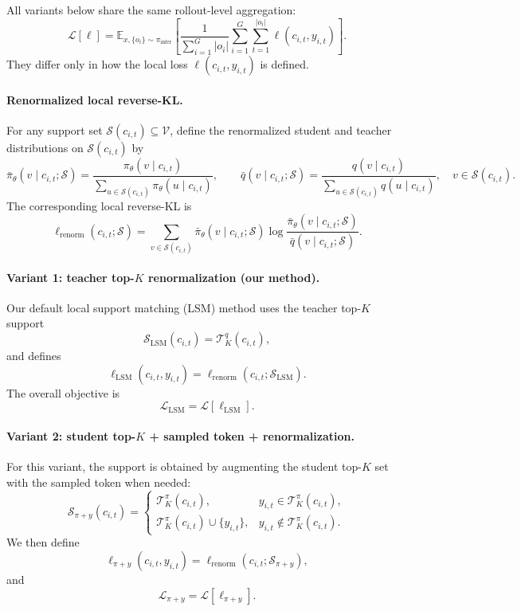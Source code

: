 \documentclass{article}
\begin{document}
All variants below share the same rollout-level aggregation:
\[
\mathcal L[\ell]
=
\mathbb E_{x,\{o_i\}\sim\pi_{\mathrm{infer}}}
\left[
\frac{1}{\sum_{i=1}^G |o_i|}
\sum_{i=1}^G \sum_{t=1}^{|o_i|}
\ell(c_{i,t}, y_{i,t})
\right].
\]
They differ only in how the local loss $\ell(c_{i,t}, y_{i,t})$ is defined.

\paragraph{Renormalized local reverse-KL.}
For any support set $\mathcal S(c_{i,t}) \subseteq \mathcal V$, define the renormalized student and teacher distributions on $\mathcal S(c_{i,t})$ by
\[
\bar\pi_\theta(v \mid c_{i,t}; \mathcal S)
=
\frac{\pi_\theta(v \mid c_{i,t})}
{\sum_{u \in \mathcal S(c_{i,t})} \pi_\theta(u \mid c_{i,t})},
\qquad
\bar q(v \mid c_{i,t}; \mathcal S)
=
\frac{q(v \mid c_{i,t})}
{\sum_{u \in \mathcal S(c_{i,t})} q(u \mid c_{i,t})},
\quad v \in \mathcal S(c_{i,t}).
\]
The corresponding local reverse-KL is
\[
\ell_{\mathrm{renorm}}(c_{i,t}; \mathcal S)
=
\sum_{v \in \mathcal S(c_{i,t})}
\bar\pi_\theta(v \mid c_{i,t}; \mathcal S)
\log
\frac{\bar\pi_\theta(v \mid c_{i,t}; \mathcal S)}
{\bar q(v \mid c_{i,t}; \mathcal S)}.
\]

\paragraph{Variant 1: teacher top-$K$ renormalization (our method).}
Our default local support matching (LSM) method uses the teacher top-$K$ support
\[
\mathcal S_{\mathrm{LSM}}(c_{i,t}) = \mathcal T_K^q(c_{i,t}),
\]
and defines
\[
\ell_{\mathrm{LSM}}(c_{i,t}, y_{i,t})
=
\ell_{\mathrm{renorm}}(c_{i,t}; \mathcal S_{\mathrm{LSM}}).
\]
The overall objective is
\[
\mathcal L_{\mathrm{LSM}} = \mathcal L[\ell_{\mathrm{LSM}}].
\]

\paragraph{Variant 2: student top-$K$ + sampled token + renormalization.}
For this variant, the support is obtained by augmenting the student top-$K$ set with the sampled token when needed:
\[
\mathcal S_{\pi+y}(c_{i,t})
=
\begin{cases}
\mathcal T_K^\pi(c_{i,t}), & y_{i,t} \in \mathcal T_K^\pi(c_{i,t}),\\[4pt]
\mathcal T_K^\pi(c_{i,t}) \cup \{y_{i,t}\}, & y_{i,t} \notin \mathcal T_K^\pi(c_{i,t}).
\end{cases}
\]
We then define
\[
\ell_{\pi+y}(c_{i,t}, y_{i,t})
=
\ell_{\mathrm{renorm}}(c_{i,t}; \mathcal S_{\pi+y}),
\]
and
\[
\mathcal L_{\pi+y} = \mathcal L[\ell_{\pi+y}].
\]
\end{document}
